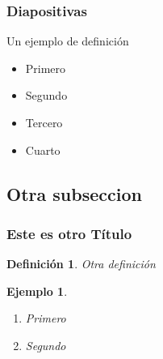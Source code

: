 \documentclass{beamer}
\newtheorem{definicion}{Definición}
\newtheorem{ejemplo}{Ejemplo}
\begin{document}
\begin{frame}
\frametitle{Diapositivas}

\begin{definition}
  Un ejemplo de definición
\end{definition}

\begin{example}
  \begin{itemize}
    \item <1-> Primero \pause
    \item <2-> Segundo \pause
    \item <3-> Tercero \pause
    \item <4-> Cuarto  
  \end{itemize}
\end{example}

\end{frame}

\subsection{Otra subseccion}
\begin{frame}
\frametitle{Este es otro Título}

\begin{definicion}
  Otra definición 
\end{definicion}

\begin{ejemplo}
  \begin{enumerate}
    \item
      Primero
      \pause

    \item
      Segundo 

  \end{enumerate}
\end{ejemplo}

\end{frame}
\end{document}
